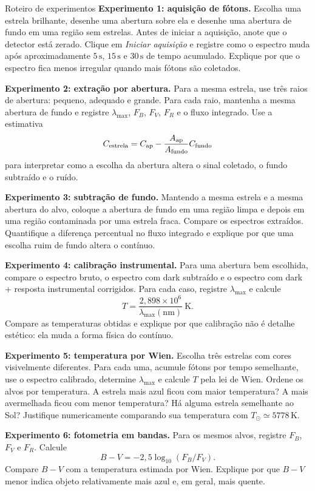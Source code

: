 \documentclass[11pt,a4paper]{article}
\begin{document}
\begin{lessonblock}[borderline west={2pt}{0pt}{astroGold}]{Roteiro de experimentos}
\textbf{Experimento 1: aquisição de fótons.}
Escolha uma estrela brilhante, desenhe uma abertura sobre ela e desenhe uma abertura de fundo em uma região sem estrelas. Antes de iniciar a aquisição, anote que o detector está zerado. Clique em \textit{Iniciar aquisição} e registre como o espectro muda após aproximadamente $5\,\mathrm{s}$, $15\,\mathrm{s}$ e $30\,\mathrm{s}$ de tempo acumulado. Explique por que o espectro fica menos irregular quando mais fótons são coletados.

\textbf{Experimento 2: extração por abertura.}
Para a mesma estrela, use três raios de abertura: pequeno, adequado e grande. Para cada raio, mantenha a mesma abertura de fundo e registre $\lambda_{\max}$, $F_B$, $F_V$, $F_R$ e o fluxo integrado. Use a estimativa
\[
C_{\rm estrela}=C_{\rm ap}-\frac{A_{\rm ap}}{A_{\rm fundo}}C_{\rm fundo}
\]
para interpretar como a escolha da abertura altera o sinal coletado, o fundo subtraído e o ruído.

\textbf{Experimento 3: subtração de fundo.}
Mantendo a mesma estrela e a mesma abertura do alvo, coloque a abertura de fundo em uma região limpa e depois em uma região contaminada por uma estrela fraca. Compare os espectros extraídos. Quantifique a diferença percentual no fluxo integrado e explique por que uma escolha ruim de fundo altera o contínuo.

\textbf{Experimento 4: calibração instrumental.}
Para uma abertura bem escolhida, compare o espectro bruto, o espectro com dark subtraído e o espectro com dark + resposta instrumental corrigidos. Para cada caso, registre $\lambda_{\max}$ e calcule
\[
T=\frac{2{,}898\times10^6}{\lambda_{\max}(\mathrm{nm})}\ \mathrm{K}.
\]
Compare as temperaturas obtidas e explique por que calibração não é detalhe estético: ela muda a forma física do contínuo.

\textbf{Experimento 5: temperatura por Wien.}
Escolha três estrelas com cores visivelmente diferentes. Para cada uma, acumule fótons por tempo semelhante, use o espectro calibrado, determine $\lambda_{\max}$ e calcule $T$ pela lei de Wien. Ordene os alvos por temperatura. A estrela mais azul ficou com maior temperatura? A mais avermelhada ficou com menor temperatura? Há alguma estrela semelhante ao Sol? Justifique numericamente comparando sua temperatura com $T_\odot\simeq5778\,\mathrm{K}$.

\textbf{Experimento 6: fotometria em bandas.}
Para os mesmos alvos, registre $F_B$, $F_V$ e $F_R$. Calcule
\[
B-V=-2{,}5\log_{10}(F_B/F_V).
\]
Compare $B-V$ com a temperatura estimada por Wien. Explique por que $B-V$ menor indica objeto relativamente mais azul e, em geral, mais quente.


\end{lessonblock}
\end{document}
